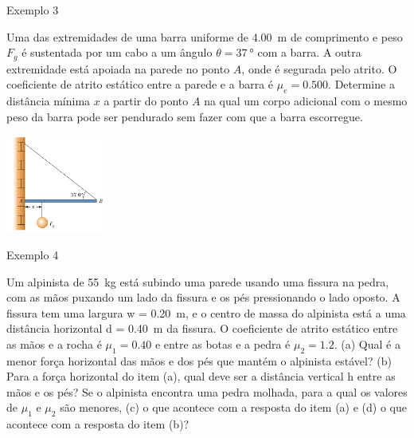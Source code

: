 \begin{frame}{Exemplo 3}
    \begin{minipage}{\textwidth}
        Uma das extremidades de uma barra uniforme de \SI{4.00}{m} de comprimento e peso $F_g$ é sustentada por um cabo a um
        ângulo $\theta=\SI{37}{\degree}$ com a barra. A outra extremidade está apoiada na parede no ponto $A$, onde é segurada pelo atrito.
        O coeficiente de atrito estático entre a parede e a barra é $\mu_e=\num{0.500}$.
        Determine a distância mínima $x$ a partir do ponto $A$ na qual um corpo adicional com o mesmo peso da barra pode ser pendurado sem
        fazer com que a barra escorregue.
    \end{minipage}

    \begin{center}
        \includegraphics[width=0.25\textwidth]{images/pendurado}
    \end{center}
\end{frame}

\begin{frame}{Exemplo 4}
    \begin{minipage}{\textwidth}
        Um alpinista de \SI{55}{kg} está subindo uma parede usando uma fissura na pedra, com as mãos puxando um
        lado da fissura e os pés pressionando o lado oposto. A fissura tem uma largura w = \SI{0.20}{m},
        e o centro de massa do alpinista está a uma distância horizontal d = \SI{0.40}{m} da fissura.
        O coeficiente de atrito estático entre as mãos e a rocha é \(\mu_1 = \num{0.40}\)
        e entre as botas e a pedra é \(\mu_2 = \num{1.2}\). (a) Qual é a menor força horizontal das
        mãos e dos pés que mantém o alpinista estável? (b) Para a força horizontal do item (a),
        qual deve ser a distância vertical h entre as mãos e os pés? Se o alpinista encontra uma pedra
        molhada, para a qual os valores de \(\mu_1\) e \(\mu_2\) são menores, (c) o que acontece com a
        resposta do item (a) e (d) o que acontece com a resposta do item (b)?
    \end{minipage}
\end{frame}

